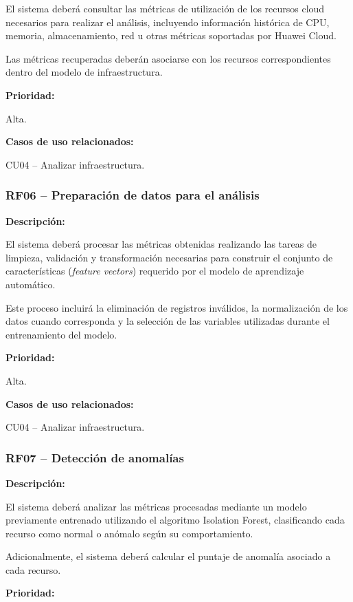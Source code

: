 El sistema deberá consultar las métricas de utilización de los recursos cloud necesarios para realizar el análisis, incluyendo información histórica de CPU, memoria, almacenamiento, red u otras métricas soportadas por Huawei Cloud.

Las métricas recuperadas deberán asociarse con los recursos correspondientes dentro del modelo de infraestructura.

\noindent \textbf{Prioridad:}

Alta.

\noindent \textbf{Casos de uso relacionados:}

\noindent CU04 -- Analizar infraestructura.

\subsubsection{RF06 -- Preparación de datos para el análisis}

\noindent \textbf{Descripción:}

El sistema deberá procesar las métricas obtenidas realizando las tareas de limpieza, validación y transformación necesarias para construir el conjunto de características (\emph{feature vectors}) requerido por el modelo de aprendizaje automático.

Este proceso incluirá la eliminación de registros inválidos, la normalización de los datos cuando corresponda y la selección de las variables utilizadas durante el entrenamiento del modelo.

\noindent \textbf{Prioridad:}

Alta.

\noindent \textbf{Casos de uso relacionados:}

\noindent CU04 -- Analizar infraestructura.

\subsubsection{RF07 -- Detección de anomalías}

\noindent \textbf{Descripción:}

El sistema deberá analizar las métricas procesadas mediante un modelo previamente entrenado utilizando el algoritmo Isolation Forest, clasificando cada recurso como normal o anómalo según su comportamiento.

Adicionalmente, el sistema deberá calcular el puntaje de anomalía asociado a cada recurso.

\noindent \textbf{Prioridad:}

